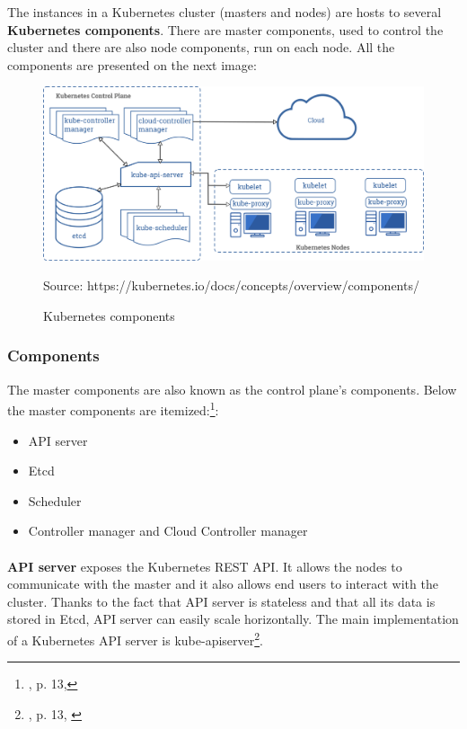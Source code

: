 The instances in a Kubernetes cluster (masters and nodes) are hosts to several \textbf{Kubernetes components}. There are master components, used to control the cluster and there are also node components, run on each node. All the components are presented on the next image:
\begin{figure}[H]
    \centering
    \includegraphics[width=14cm]{figures/components-of-kubernetes.png}
    \label{fig:cluster}
    \caption{Kubernetes components}
    \small{Source: https://kubernetes.io/docs/concepts/overview/components/}
\end{figure}


\subsubsection{Components}
The master components are also known as the control plane’s components. Below the master components are itemized:\footnote{\cite{book-mastering-k8s}, p. 13,\cite{k8s-components}}:
\begin{itemize}
\item API server
\item Etcd
\item Scheduler
\item Controller manager and Cloud Controller manager
\end{itemize}

\paragraph{}
\textbf{API server} exposes the Kubernetes REST API. It allows the nodes to communicate with the master and it also allows end users to interact with the cluster. Thanks to the fact that API server is stateless and that all its data is stored in Etcd, API server can easily scale horizontally. The main implementation of a Kubernetes API server is kube-apiserver\footnote{\cite{book-mastering-k8s}, p. 13, \cite{k8s-cluster,k8s-components}}.


